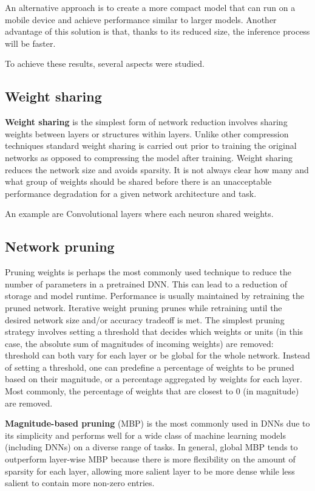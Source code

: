 An alternative approach is to create a more compact model that can run on a mobile device and 
achieve performance similar to larger models. Another advantage of this solution is that, 
thanks to its reduced size, the inference process will be faster.

To achieve these results, several aspects were studied.
\subsection{Weight sharing}
\textbf{Weight sharing} is the simplest form of network reduction involves sharing weights between 
layers or structures within layers. Unlike other compression techniques standard weight sharing is 
carried out prior to training the original networks as opposed to compressing the model after 
training. Weight sharing reduces the network size and avoids sparsity. It is not always clear how 
many and what group of weights should be shared before there is an unacceptable performance 
degradation for a given network architecture and task.

\begin{esempio}
An example are Convolutional layers where each neuron shared weights.
\end{esempio}

\subsection{Network pruning}
Pruning weights is perhaps the most commonly used technique to reduce the number of parameters in a 
pretrained DNN. This can lead to a reduction of storage and model runtime. Performance is usually
maintained by retraining the pruned network. Iterative weight pruning prunes while retraining until 
the desired network size and/or accuracy tradeoff is met. The simplest pruning strategy involves 
setting a threshold that decides which weights or units (in this case, the absolute sum of magnitudes 
of incoming weights) are removed: threshold can both vary for each layer or be global for the whole
network. Instead of setting a threshold, one can predefine a percentage of weights to be pruned based 
on their magnitude, or a percentage aggregated by weights for each layer. Most commonly, the percentage 
of weights that are closest to 0 (in magnitude) are removed.
    
\textbf{Magnitude-based pruning} (MBP) is the most commonly used in DNNs due to its simplicity and 
performs well for a wide class of machine learning models (including DNNs) on a diverse range of tasks. 
In general, global MBP tends to outperform layer-wise MBP because there is more flexibility on the 
amount of sparsity for each layer, allowing more salient layer to be more dense while less salient 
to contain more non-zero entries.

